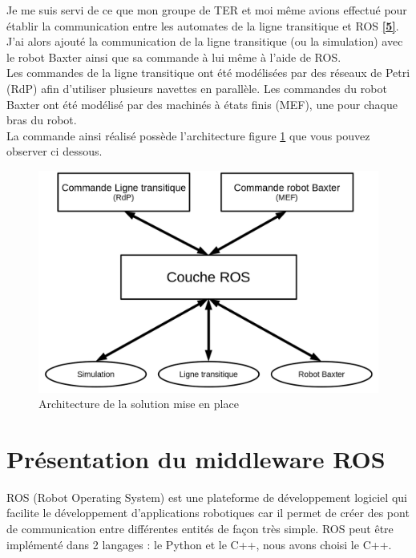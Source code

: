 \documentclass[a4paper,french, titlepage]{book}
\begin{document}
Je me suis servi de ce que mon groupe de TER et moi même avions effectué pour établir la communication entre les automates de la ligne transitique et ROS \hyperref[biblio]{\textbf{[5]}}. J'ai alors ajouté la communication de la ligne transitique (ou la simulation) avec le robot Baxter ainsi que sa commande à lui même à l'aide de ROS.\\

Les commandes de la ligne transitique ont été modélisées par des réseaux de Petri (RdP) afin d'utiliser plusieurs navettes en parallèle. Les commandes du robot Baxter ont été modélisé par des machinés à états finis (MEF), une pour chaque bras du robot.\\

La commande ainsi réalisé possède l'architecture figure \ref{schema_solution} que vous pouvez observer ci dessous.

\begin{figure}[H] 
\begin{center}
\includegraphics[scale=0.4]{Images/solution.png} 
\end{center}
\caption{Architecture de la solution mise en place}
\label{schema_solution}
\end{figure} 

\newpage
\section{Présentation du middleware ROS}

ROS (Robot Operating System) est une plateforme de développement logiciel qui facilite le développement d'applications robotiques car il permet de créer des pont de communication entre différentes entités de façon très simple. ROS peut être implémenté dans 2 langages : le Python et le C++, nous avons choisi le C++.\\
\end{document}
